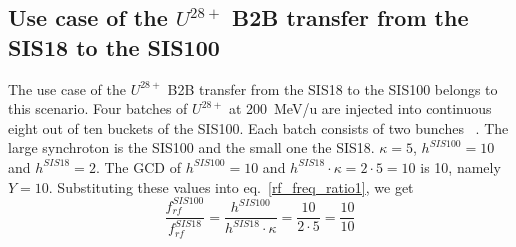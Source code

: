 
\subsection{Use case of the $U^{28+}$ B2B transfer from the SIS18 to the SIS100}
The use case of the $U^{28+}$ B2B transfer from the SIS18 to the SIS100 belongs to this scenario. Four batches of $U^{28+}$ at \SI{200}{MeV/\atomicmassunit} are injected into continuous eight out of ten buckets of the SIS100. Each batch consists of two bunches ~\cite{liebermann_fair_2013, liebermann_sis100_2013}. The large synchroton is the SIS100 and the small one the SIS18. $\kappa=5$, $h^{\mathit{SIS100}}=10$ and $h^{\mathit{SIS18}}=2$. %
The GCD of $h^{\mathit{SIS100}}=10$ and $h^{\mathit{SIS18}} \cdot \kappa=2\cdot 5=10$ is 10, namely $Y=10$. Substituting these values into eq.~\ref{rf_freq_ratio1}, we get
\begin{equation}
\frac{f_{\mathit{rf}}^{\mathit{SIS100}}}{f_{\mathit{rf}}^{\mathit{SIS18}}}= \frac {h^{\mathit{SIS100}}}{h^{\mathit{SIS18}} \cdot \kappa}= \frac{10}{2 \cdot 5}=\frac{10}{10}
\end{equation}

